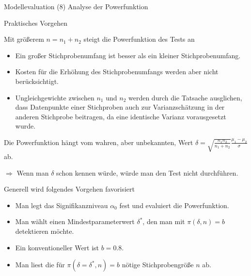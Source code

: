 \documentclass[
  8pt,
  ignorenonframetext,
]{beamer}
\begin{document}
\begin{frame}{Modellevaluation}
\protect\hypertarget{modellevaluation-37}{}
\noindent (8) Analyse der Powerfunktion

\small

Praktisches Vorgehen

Mit größerem \(n = n_1 + n_2\) steigt die Powerfunktion des Tests an

\begin{itemize}
\item
  Ein großer Stichprobenumfang ist besser als ein kleiner
  Stichprobenumfang.
\item
  Kosten für die Erhöhung des Stichprobenumfangs werden aber nicht
  berücksichtigt.
\item
  \justifying Ungleichgewichte zwischen \(n_1\) und \(n_2\) werden durch
  die Tatsache ausglichen, dass Datenpunkte einer Stichproben auch zur
  Varianzschätzung in der anderen Stichprobe beitragen, da eine
  identische Varianz vorausgesetzt wurde.
\end{itemize}

\vspace{1mm}

Die Powerfunktion hängt vom wahren, aber unbekannten, Wert
\(\delta = \sqrt{\frac{n_1n_2}{n_1+n_2}}\frac{\mu_1-\mu_2}{\sigma}\) ab.

\(\Rightarrow\) Wenn man \(\delta\) schon kennen würde, würde man den
Test nicht durchführen.

\vspace{1mm}

Generell wird folgendes Vorgehen favorisiert

\begin{itemize}
\item
  Man legt das Signifikanzniveau \(\alpha_0\) fest und evaluiert die
  Powerfunktion.
\item
  Man wählt einen Mindestparameterwert \(\delta^*\), den man mit
  \(\pi(\delta,n) = b\) detektieren möchte.
\item
  Ein konventioneller Wert ist \(b= 0.8\).
\item
  Man liest die für \(\pi(\delta = \delta^*,n) = b\) nötige
  Stichprobengröße \(n\) ab.
\end{itemize}
\end{frame}
\end{document}
